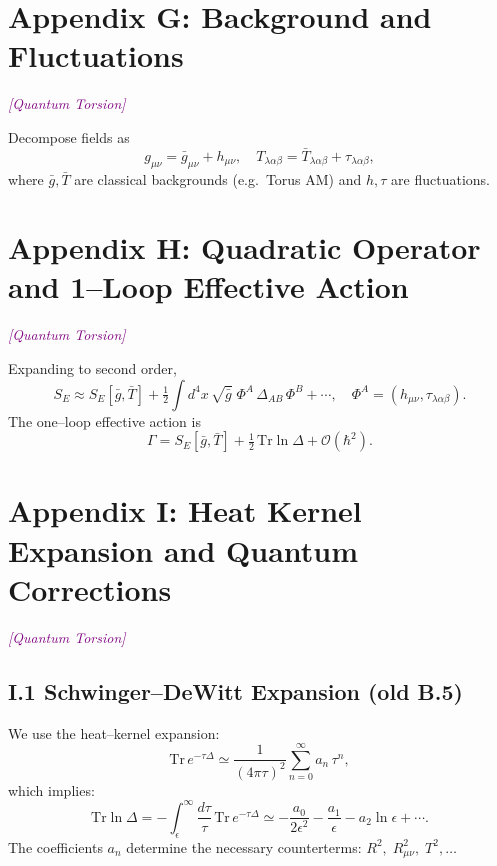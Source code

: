 \documentclass{article}
\newcommand{\Tr}{\mathrm{Tr}}
\newcommand{\quantumtag}{\textcolor{purple}{\textit{[Quantum Torsion]}}}
\begin{document}
\section*{Appendix G: Background and Fluctuations}
\quantumtag


Decompose fields as
\begin{equation}\label{eq:auto198}
g_{\mu\nu} = \bar g_{\mu\nu} + h_{\mu\nu},
  \quad
  T_{\lambda\alpha\beta} = \bar T_{\lambda\alpha\beta} + \tau_{\lambda\alpha\beta},
\end{equation}
where \(\bar g,\bar T\) are classical backgrounds (e.g.\ Torus AM) and \(h,\tau\) are fluctuations.



\section*{Appendix H: Quadratic Operator and 1–Loop Effective Action}
\quantumtag


Expanding to second order,
\begin{equation}\label{eq:auto199}
S_E \approx S_E[\bar g,\bar T]
  + \tfrac12\!\int d^4x\,\sqrt{\bar g}\;
    \Phi^A\,\Delta_{AB}\,\Phi^B + \cdots,
  \quad
  \Phi^A=(h_{\mu\nu},\tau_{\lambda\alpha\beta}).
\end{equation}
The one–loop effective action is
\begin{equation}\label{eq:auto200}
\Gamma
  = S_E[\bar g,\bar T]
  + \tfrac12\,\Tr\ln\Delta
  + \mathcal O(\hbar^2).
\end{equation}


\section*{Appendix I: Heat Kernel Expansion and Quantum Corrections}

\label{app:heat-kernel-merged}
\quantumtag


\subsection*{I.1 Schwinger–DeWitt Expansion (old B.5)}
We use the heat–kernel expansion:
\begin{equation}\label{eq:auto201}
\Tr\,e^{-\tau\Delta}
  \simeq \frac{1}{(4\pi\tau)^2}
    \sum_{n=0}^\infty a_n\,\tau^n,
\end{equation}
which implies:
\begin{equation}\label{eq:auto202}
\Tr\ln\Delta
  = -\int_\epsilon^\infty\frac{d\tau}{\tau}\,
    \Tr\,e^{-\tau\Delta}
  \simeq -\frac{a_0}{2\epsilon^2}
    -\frac{a_1}{\epsilon}
    -a_2\ln\epsilon + \cdots.
\end{equation}
The coefficients \(a_n\) determine the necessary counterterms: \(R^2,\;R_{\mu\nu}^2,\;T^2,\dots\)
\end{document}
